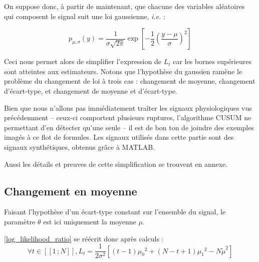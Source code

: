 \documentclass[french,11pt,notitlepage]{report}
\begin{document}
	On suppose donc, à partir de maintenant, que chacune des variables aléatoires qui composent le signal suit une loi gaussienne, \emph{i.e.} :
	
	\begin{equation*}
		p_{\mu, \sigma}(y) = \frac1{\sigma\sqrt{2 \pi}} \exp \left[ -\frac12 \left( \frac{y - \mu}{\sigma} \right)^2 \right]
	\end{equation*}
	
	
	Ceci nous permet alors de simplifier l'expression de $L_t$
	car les bornes supérieures sont atteintes aux estimateurs.
	Notons que l'hypothèse du gaussien ramène le problème du changement de loi à trois cas :
	changement de moyenne, changement d'écart-type, et changement de moyenne et d'écart-type.
	
		Bien que nous n'allons pas immédiatement traîter les signaux physiologiques vus précédemment --
	ceux-ci comportent plusieurs ruptures, l'algorithme CUSUM ne permettant d'en détecter qu'une seule -- il est de bon ton de joindre des exemples imagés à ce flot de formules.
	Les signaux utilisés dans cette partie sont des signaux synthétiques, obtenus grâce à MATLAB.
	
		Aussi les détails et preuves de cette simplification se trouvent en annexe.
		
	
	\subsection{Changement en moyenne}
	
	
	Faisant l'hypothèse d'un écart-type constant sur l'ensemble du signal, le paramètre $\theta$ est ici uniquement la moyenne $\mu$.
	
	\ref{log_likelihood_ratio} se réécrit donc après calculs :
	\begin{equation}
		\forall t \in [\![1\,; N]\!], L_t = \frac{1}{2 \sigma ^2}\left[(t-1){\mu_0}^2 + (N - t + 1){\mu_1}^2 - N{\tilde\mu}^2 \right]
		\label{meanchange}
	\end{equation}
	
\end{document}
